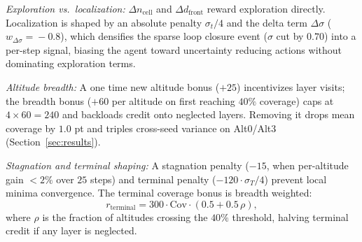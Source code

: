 \documentclass[conference]{IEEEtran}
\begin{document}
\emph{Exploration vs.\ localization:} $\Delta n_{\text{cell}}$ and $\Delta d_{\text{front}}$ reward exploration directly. Localization is shaped by an absolute penalty $\sigma_t/4$ and the delta term $\Delta\sigma$ ($w_{\Delta\sigma}\!=\!-0.8$), which densifies the sparse loop closure event ($\sigma$ cut by $0.70$) into a per-step signal, biasing the agent toward uncertainty reducing actions without dominating exploration terms.

\emph{Altitude breadth:} A one time new altitude bonus ($+25$) incentivizes layer visits; the breadth bonus ($+60$ per altitude on first reaching $40\%$ coverage) caps at $4\!\times\!60\!=\!240$ and backloads credit onto neglected layers. Removing it drops mean coverage by $1.0$ pt and triples cross-seed variance on Alt0/Alt3 (Section~\ref{sec:results}).

\emph{Stagnation and terminal shaping:} A stagnation penalty ($-15$, when per-altitude gain $<\!2\%$ over $25$ steps) and terminal penalty ($-120\!\cdot\!\sigma_T/4$) prevent local minima convergence. The terminal coverage bonus is breadth weighted:
\begin{equation}
    r_{\text{terminal}} = 300\cdot\mathrm{Cov}\cdot(0.5 + 0.5\,\rho),
\end{equation}
where $\rho$ is the fraction of altitudes crossing the $40\%$ threshold, halving terminal credit if any layer is neglected.
\end{document}
